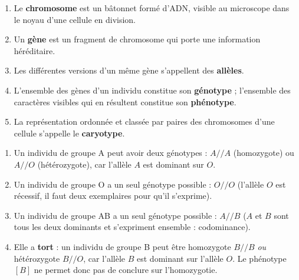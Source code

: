 \documentclass[11pt]{article}
\begin{document}
\begin{corrige}
\begin{enumerate}
\item Le \textbf{chromosome} est un bâtonnet formé d'ADN, visible au microscope dans le noyau d'une cellule en division.
\item Un \textbf{gène} est un fragment de chromosome qui porte une information héréditaire.
\item Les différentes versions d'un même gène s'appellent des \textbf{allèles}.
\item L'ensemble des gènes d'un individu constitue son \textbf{génotype} ; l'ensemble des caractères visibles qui en résultent constitue son \textbf{phénotype}.
\item La représentation ordonnée et classée par paires des chromosomes d'une cellule s'appelle le \textbf{caryotype}.
\end{enumerate}
\end{corrige}

\begin{corrige}
\begin{enumerate}
\item Un individu de groupe A peut avoir deux génotypes : $A//A$ (homozygote) ou $A//O$ (hétérozygote), car l'allèle $A$ est dominant sur $O$.
\item Un individu de groupe O a un seul génotype possible : $O//O$ (l'allèle $O$ est récessif, il faut deux exemplaires pour qu'il s'exprime).
\item Un individu de groupe AB a un seul génotype possible : $A//B$ ($A$ et $B$ sont tous les deux dominants et s'expriment ensemble : codominance).
\item Elle a \textbf{tort} : un individu de groupe B peut être homozygote $B//B$ \emph{ou} hétérozygote $B//O$, car l'allèle $B$ est dominant sur l'allèle $O$. Le phénotype $[B]$ ne permet donc pas de conclure sur l'homozygotie.
\end{enumerate}
\end{corrige}
\end{document}
